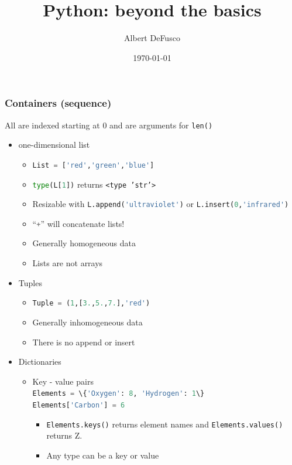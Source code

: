 \documentclass[xcolor=table,10pt,final]{beamer}
\begin{document}
\title{Python: beyond the basics}
\author{Albert DeFusco}
\date{\today}


\frame{\titlepage}

\begin{frame}
  \frametitle{Containers (sequence)}
  All are indexed starting at 0 and are arguments for {\tt len()}
  \begin{itemize}
    \item one-dimensional list
      \begin{itemize}
        \item \lstinline[language=python]|List = ['red','green','blue']|
        \item \lstinline[language=python]|type(L[1])| returns {\tt <type 'str'>}
        \item Resizable with \lstinline[language=python]|L.append('ultraviolet')| or \lstinline[language=python]|L.insert(0,'infrared')|
        \item ``\lstinline[language=python]|+|'' will concatenate lists!
        \item Generally homogeneous data
        \item Lists are not arrays
      \end{itemize}
    \item Tuples
      \begin{itemize}
        \item \lstinline[language=python]|Tuple = (1,[3.,5.,7.],'red')|
        \item Generally inhomogeneous data
        \item There is no append or insert
      \end{itemize}
    \item Dictionaries
      \begin{itemize}
        \item Key - value pairs\\
          \lstinline[language=python]|Elements = \{'Oxygen': 8, 'Hydrogen': 1\}|\\
          \lstinline[language=python]|Elements['Carbon'] = 6|\\
          \begin{itemize}
            \item \lstinline[language=python]|Elements.keys()| returns element names and \lstinline[language=python]|Elements.values()| returns Z.
            \item Any type can be a key or value
          \end{itemize}
      \end{itemize}
  \end{itemize}
\end{frame}
\end{document}
